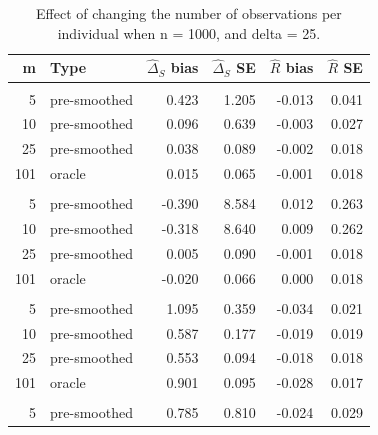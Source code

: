 \documentclass[useAMS,usenatbib,referee]{biom}
\begin{document}
\begin{table}[t]

\caption{\label{tab:large-n-all-nl}Effect of changing the number of observations per individual when n = 1000, and delta = 25.}
\centering
\begin{tabular}{rlrrrr}
\toprule
m & Type & $\widehat{\Delta}_S$ bias & $\widehat{\Delta}_S$ SE & $\widehat{R}$ bias & $\widehat{R}$ SE\\
\midrule
\addlinespace[0.3em]
\multicolumn{6}{l}{\textbf{GAM}}\\
\hspace{1em}5 & pre-smoothed & 0.423 & 1.205 & -0.013 & 0.041\\
\hspace{1em}10 & pre-smoothed & 0.096 & 0.639 & -0.003 & 0.027\\
\hspace{1em}25 & pre-smoothed & 0.038 & 0.089 & -0.002 & 0.018\\
\hspace{1em}101 & oracle & 0.015 & 0.065 & -0.001 & 0.018\\
\addlinespace[0.3em]
\multicolumn{6}{l}{\textbf{GAM-unsmoothed}}\\
\hspace{1em}5 & pre-smoothed & -0.390 & 8.584 & 0.012 & 0.263\\
\hspace{1em}10 & pre-smoothed & -0.318 & 8.640 & 0.009 & 0.262\\
\hspace{1em}25 & pre-smoothed & 0.005 & 0.090 & -0.001 & 0.018\\
\hspace{1em}101 & oracle & -0.020 & 0.066 & 0.000 & 0.018\\
\addlinespace[0.3em]
\multicolumn{6}{l}{\textbf{Kernel}}\\
\hspace{1em}5 & pre-smoothed & 1.095 & 0.359 & -0.034 & 0.021\\
\hspace{1em}10 & pre-smoothed & 0.587 & 0.177 & -0.019 & 0.019\\
\hspace{1em}25 & pre-smoothed & 0.553 & 0.094 & -0.018 & 0.018\\
\hspace{1em}101 & oracle & 0.901 & 0.095 & -0.028 & 0.017\\
\addlinespace[0.3em]
\multicolumn{6}{l}{\textbf{Linear}}\\
\hspace{1em}5 & pre-smoothed & 0.785 & 0.810 & -0.024 & 0.029\\

\end{tabular}
\end{table}
\end{document}
